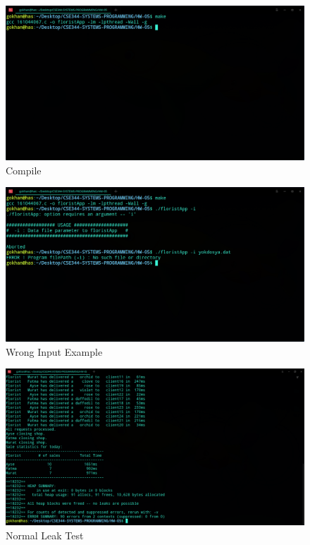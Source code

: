\documentclass{article}
\begin{document}
\begin{figure}[h!]
\centering
\includegraphics[scale=0.3]{compile.png}
\caption{Compile}
\label{fig:compile}
\end{figure}

\begin{figure}[h!]
\centering
\includegraphics[scale=0.33]{wronginput.png}
\caption{Wrong Input Example}
\label{fig:compile}
\end{figure}

\begin{figure}[h!]
\centering
\includegraphics[scale=0.27]{normalleaktest.png}
\caption{Normal Leak Test}
\label{fig:compile}
\end{figure}
\end{document}
